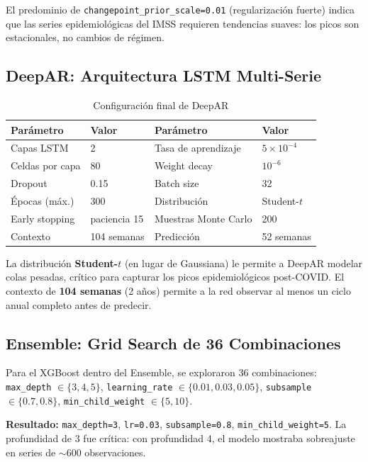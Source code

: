 \documentclass[12pt, letterpaper]{article}
\begin{document}
El predominio de \texttt{changepoint\_prior\_scale=0.01} (regularización fuerte) indica que las series epidemiológicas del IMSS requieren tendencias suaves: los picos son estacionales, no cambios de régimen.

\subsection{DeepAR: Arquitectura LSTM Multi-Serie}

\begin{table}[H]
\centering
\caption{Configuración final de DeepAR}
\label{tab:deepar_hp}
\small
\begin{tabular}{ll|ll}
\toprule
\textbf{Parámetro} & \textbf{Valor} & \textbf{Parámetro} & \textbf{Valor} \\
\midrule
Capas LSTM          & 2              & Tasa de aprendizaje   & $5 \times 10^{-4}$ \\
Celdas por capa     & 80             & Weight decay          & $10^{-6}$ \\
Dropout             & 0.15           & Batch size            & 32 \\
Épocas (máx.)       & 300            & Distribución          & Student-$t$ \\
Early stopping      & paciencia 15   & Muestras Monte Carlo  & 200 \\
Contexto            & 104 semanas    & Predicción            & 52 semanas \\
\bottomrule
\end{tabular}
\end{table}

La distribución \textbf{Student-$t$} (en lugar de Gaussiana) le permite a DeepAR modelar colas pesadas, crítico para capturar los picos epidemiológicos post-COVID. El contexto de \textbf{104 semanas} (2 años) permite a la red observar al menos un ciclo anual completo antes de predecir.

\subsection{Ensemble: Grid Search de 36 Combinaciones}

Para el XGBoost dentro del Ensemble, se exploraron 36 combinaciones:
\texttt{max\_depth} $\in \{3,4,5\}$, \texttt{learning\_rate} $\in \{0.01, 0.03, 0.05\}$, \texttt{subsample} $\in \{0.7, 0.8\}$, \texttt{min\_child\_weight} $\in \{5, 10\}$.

\textbf{Resultado:} \texttt{max\_depth=3}, \texttt{lr=0.03}, \texttt{subsample=0.8}, \texttt{min\_child\_weight=5}. La profundidad de 3 fue crítica: con profundidad 4, el modelo mostraba sobreajuste en series de $\sim$600 observaciones.
\end{document}
